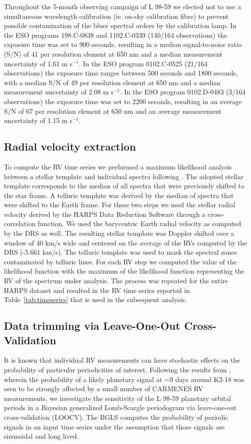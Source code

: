 \documentclass[longauth]{aa}
\newcommand{\mps}{m s$^{-1}$}
\begin{document}
Throughout the 5-month observing campaign of L 98-59 we elected not to use a simultaneous wavelength calibration 
(ie. on-sky calibration fibre) to prevent possible contamination of the bluer spectral orders by the calibration lamp. In the ESO programs 198.C-0838 and 1102.C-0339 (140/164 observations) the exposure time was set to 900 seconds, resulting in a median signal-to-noise ratio (S/N) of 41 per resolution element at 650 nm and a median measurement uncertainty of 1.61 \mps{.} In the ESO program 0102.C-0525 (21/164 observations) the exposure time ranges between 500 seconds and 1800 seconds, with a median S/N of 49 per resolution element at 650 nm and a median measurement uncertainty of 2.08 \mps{.} In the ESO program 0102.D-0483 (3/164 observations) the exposure time was set to 2200 seconds, resulting in an average S/N of 67 per resolution element at 650 nm and an average measurement uncertainty of 1.15 \mps{.}

\subsection{Radial velocity extraction}
To compute the RV time series we performed a maximum likelihood analysis between a stellar
template and individual spectra following \citet{astudillodefru17a}. The adopted stellar template corresponds
to the median of all spectra that were previously shifted to the star frame. A telluric template was 
derived by the median of spectra that were shifted to the Earth frame. For these two steps we used the 
stellar radial velocity derived by the HARPS Data Reduction Software \citep[DRS;][]{lovis07} through a cross-correlation
function. We used the barycentric Earth radial velocity as computed by the DRS as well. The resulting stellar template 
was Doppler shifted over a window of 40 km/s wide and centered on the average of the RVs 
computed by the DRS (-5.661 km/s). The telluric template was used to mask the spectral zones contaminated 
by telluric lines. For each RV step we computed the value of the likelihood function with the maximum of the 
likelihood
function representing the RV of the spectrum under analysis. The process was repeated for the entire HARPS
dataset and resulted in the RV time series reported in Table~\ref{tab:timeseries} that is used in the subsequent
analysis.

\iffalse
\subsection{Data trimming via Leave-One-Out Cross-Validation}
\label{subsec:loocv}
It is known that individual RV measurements can have stochastic effects on the probability of particular periodicities of interest. Following the results from  \citep{cloutier19}, wherein the probability of a likely planetary signal at $\sim 9$ days around K2-18 was seen to be strongly affected by a small number of CARMENES RV measurements, we investigate the sensitivity of the L 98-59 planetary orbital periods in a Bayesian generalized Lomb-Scargle periodogram \citep[BGLS;][]{mortier16} via leave-one-out cross-validation (LOOCV). The BGLS computes the probability of periodic signals in an input time series under the assumption that those signals are sinusoidal and long lived.
\end{document}
